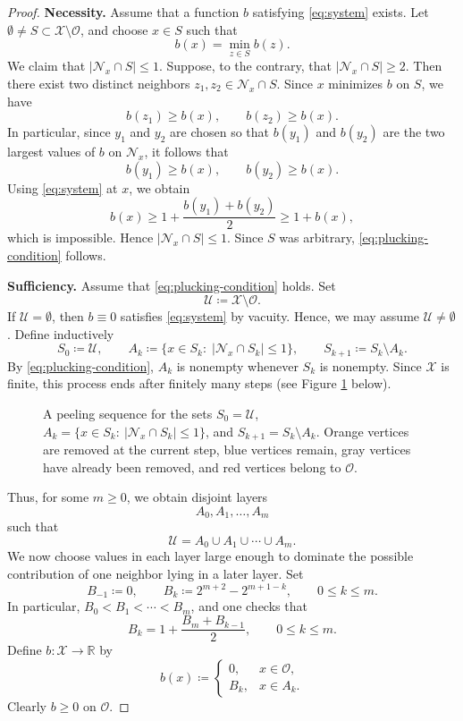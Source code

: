 \documentclass[reqno,11pt]{amsart}
\numberwithin{equation}{section}
\theoremstyle{definition}
\theoremstyle{remark}
\begin{document}
\begin{proof}

\noindent\textbf{Necessity.} Assume that a function $b$ satisfying \eqref{eq:system} exists. Let $\emptyset\neq S\subset \mathcal{X}\setminus\mathcal{O}$, and choose $x\in S$ such that
\[
    b(x)=\min_{z\in S} b(z).
\]
We claim that $|\mathcal{N}_x\cap S|\le 1$. Suppose, to the contrary, that $|\mathcal{N}_x\cap S|\ge 2$. Then there exist two distinct neighbors $z_1,z_2\in\mathcal{N}_x\cap S$. Since $x$ minimizes $b$ on $S$, we have
\[
    b(z_1)\ge b(x),
    \qquad
    b(z_2)\ge b(x).
\]
In particular, since $y_1$ and $y_2$ are chosen so that $b(y_1)$ and $b(y_2)$ are the two largest values of $b$ on $\mathcal{N}_x$, it follows that
\[
    b(y_1)\ge b(x),
    \qquad
    b(y_2)\ge b(x).
\]
Using \eqref{eq:system} at $x$, we obtain
\[
    b(x)
    \ge
    1+\frac{b(y_1)+b(y_2)}{2}
    \ge
    1+b(x),
\]
which is impossible. Hence $|\mathcal{N}_x\cap S|\le 1$. Since $S$ was arbitrary, \eqref{eq:plucking-condition} follows.



\noindent\textbf{Sufficiency.} Assume that \eqref{eq:plucking-condition} holds. Set
\[
     \mathcal{U} \coloneqq \mathcal{X}\setminus\mathcal{O}.
\]
If $\mathcal{U}=\emptyset$, then $b\equiv 0$ satisfies \eqref{eq:system} by vacuity. Hence, we may assume $\mathcal{U}\neq\emptyset$. Define inductively
\[
    S_0 \coloneqq \mathcal{U},
    \qquad
    A_k \coloneqq \{x\in S_k \colon \;|\mathcal{N}_x\cap S_k|\le 1\},
    \qquad
    S_{k+1} \coloneqq S_k\setminus A_k.
\]
By \eqref{eq:plucking-condition}, $A_k$ is nonempty whenever $S_k$ is nonempty. Since $\mathcal{X}$ is finite, this process ends after finitely many steps (see Figure \ref{fig:peeling-process} below).

\begin{figure}[ht]
\centering



\caption{A peeling sequence for the sets
$S_0=\mathcal{U}$, $A_k=\{x\in S_k:\ |\mathcal N_x\cap S_k|\le 1\}$, and
$S_{k+1}=S_k\setminus A_k$. Orange vertices are removed at the current step,
blue vertices remain, gray vertices have already been removed, and red
vertices belong to $\mathcal O$.}
\label{fig:peeling-process}
\end{figure}

Thus, for some $m\ge 0$, we obtain disjoint layers
\[
    A_0,A_1,\dots,A_m
\]
such that
\[
    \mathcal{U}=A_0\cup A_1\cup\cdots\cup A_m.
\]
We now choose values in each layer large enough to dominate the possible contribution of one neighbor lying in a later layer. Set
\[
    B_{-1} \coloneqq 0,
    \qquad
    B_k \coloneqq 2^{m+2}-2^{m+1-k},
    \qquad 0\le k\le m .
\]
In particular, $B_0<B_1<\cdots<B_m$, and one checks that
\[
    B_k
    =
    1+\frac{B_m+B_{k-1}}{2},
    \qquad 0\le k\le m .
\]
Define $b \colon \mathcal{X}\to\mathbb{R}$ by
\[
    b(x)\coloneqq 
    \begin{cases}
        0, & x\in\mathcal{O},\\
        B_k, & x\in A_k.
    \end{cases}
\]
Clearly $b\ge 0$ on $\mathcal{O}$.


\end{proof}
\end{document}
